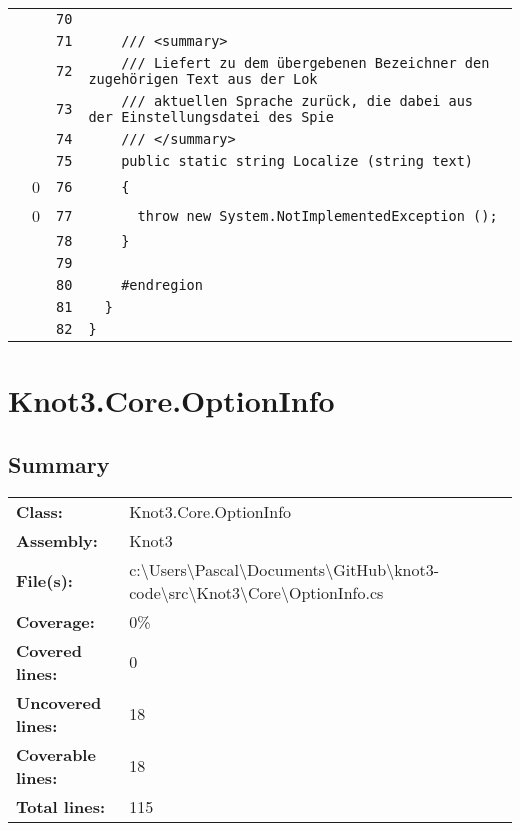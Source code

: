 \documentclass[a4paper,10pt]{article}
\begin{document}
\begin{longtable}[l]{lrrl}
\cellcolor{gray} &  & \verb~70~ & \verb~~\\
\cellcolor{gray} &  & \verb~71~ & \verb~    /// <summary>~\\
\cellcolor{gray} &  & \verb~72~ & \verb~    /// Liefert zu dem übergebenen Bezeichner den zugehörigen Text aus der Lok~\\
\cellcolor{gray} &  & \verb~73~ & \verb~    /// aktuellen Sprache zurück, die dabei aus der Einstellungsdatei des Spie~\\
\cellcolor{gray} &  & \verb~74~ & \verb~    /// </summary>~\\
\cellcolor{gray} &  & \verb~75~ & \verb~    public static string Localize (string text)~\\
\cellcolor{red} & 0 & \verb~76~ & \verb~    {~\\
\cellcolor{red} & 0 & \verb~77~ & \verb~      throw new System.NotImplementedException ();~\\
\cellcolor{gray} &  & \verb~78~ & \verb~    }~\\
\cellcolor{gray} &  & \verb~79~ & \verb~~\\
\cellcolor{gray} &  & \verb~80~ & \verb~    #endregion~\\
\cellcolor{gray} &  & \verb~81~ & \verb~  }~\\
\cellcolor{gray} &  & \verb~82~ & \verb~}~\\
\end{longtable}
\newpage
\section{Knot3.Core.OptionInfo}
\subsection{Summary}
\begin{longtable}[l]{ll}
\textbf{Class:} & Knot3.Core.OptionInfo\\
\textbf{Assembly:} & Knot3\\
\textbf{File(s):} & \begin{minipage}[t]{12cm}{c:\textbackslash Users\textbackslash Pascal\textbackslash Documents\textbackslash GitHub\textbackslash knot3-code\textbackslash src\textbackslash Knot3\textbackslash Core\textbackslash OptionInfo.cs}\end{minipage} \\
\textbf{Coverage:} & 0\%\\
\textbf{Covered lines:} & 0\\
\textbf{Uncovered lines:} & 18\\
\textbf{Coverable lines:} & 18\\
\textbf{Total lines:} & 115\\
\end{longtable}
\end{document}
